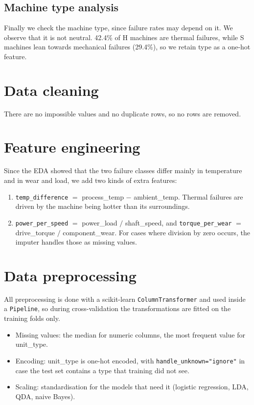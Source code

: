 \documentclass[11pt]{article}
\begin{document}
\subsection{Machine type analysis}

Finally we check the machine type, since failure rates may depend on it. We observe that it is not neutral. 42.4\% of H machines are thermal failures, while S machines lean towards mechanical failures (29.4\%), so we retain type as a one-hot feature.

\section{Data cleaning}

There are no impossible values and no duplicate rows, so no rows are removed.

\section{Feature engineering}

Since the EDA showed that the two failure classes differ mainly in temperature and in wear and load, we add two kinds of extra features:

\begin{enumerate}
  \item \texttt{temp\_difference} $=$ process\_temp $-$ ambient\_temp. Thermal failures are driven by the machine being hotter than its surroundings.
  \item \texttt{power\_per\_speed} $=$ power\_load $/$ shaft\_speed, and \texttt{torque\_per\_wear} $=$ drive\_torque $/$ component\_wear. For cases where division by zero occurs, the imputer handles those as missing values.
\end{enumerate}

\section{Data preprocessing}

All preprocessing is done with a scikit-learn \texttt{ColumnTransformer} and used inside a \texttt{Pipeline}, so during cross-validation the transformations are fitted on the training folds only.

\begin{itemize}
  \item Missing values: the median for numeric columns, the most frequent value for unit\_type.
  \item Encoding: unit\_type is one-hot encoded, with \texttt{handle\_unknown="ignore"} in case the test set contains a type that training did not see.
  \item Scaling: standardisation for the models that need it (logistic regression, LDA, QDA, naive Bayes).
\end{itemize}
\end{document}
